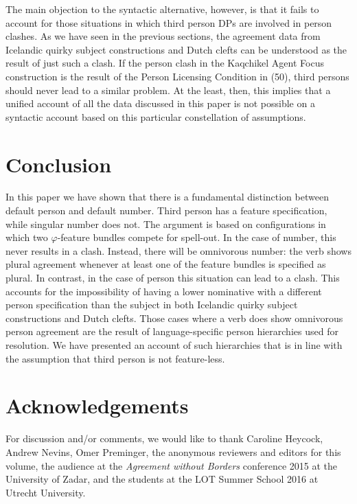 \documentclass[output=paper]{langsci/langscibook}
\begin{document}
  The main objection to the syntactic alternative, however, is that it fails to account for those situations in which third person DPs are involved in person clashes. As we have seen in the previous sections, the agreement data from Icelandic quirky subject constructions and Dutch clefts can be understood as the result of just such a clash. If the person clash in the Kaqchikel Agent Focus construction is the result of the Person Licensing Condition in (50), third persons should never lead to a similar problem. At the least, then, this implies that a unified account of all the data discussed in this paper is not possible on a syntactic account based on this particular constellation of assumptions.

\section{Conclusion}
In this paper we have shown that there is a fundamental distinction between default person and default number. Third person has a feature specification, while singular number does not. The argument is based on configurations in which two $\varphi $-feature bundles compete for spell-out. In the case of number, this never results in a clash. Instead, there will be omnivorous number: the verb shows plural agreement whenever at least one of the feature bundles is specified as plural. In contrast, in the case of person this situation can lead to a clash. This accounts for the impossibility of having a lower nominative with a different person specification than the subject in both Icelandic quirky subject constructions and Dutch clefts. Those cases where a verb does show omnivorous person agreement are the result of language-specific person hierarchies used for resolution. We have presented an account of such hierarchies that is in line with the assumption that third person is not feature-less. 

\section*{Acknowledgements}
For discussion and\slash or comments, we would like to thank Caroline Heycock, Andrew Nevins, Omer Preminger, the anonymous reviewers and editors for this volume, the audience at the \textit{Agreement without Borders} conference 2015 at the University of Zadar, and the students at the LOT Summer School 2016 at Utrecht University.
\end{document}
